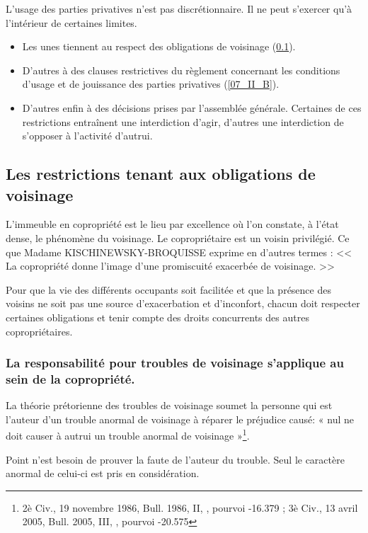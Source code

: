 	L'usage des parties privatives n'est pas discrétionnaire. Il ne peut s'exercer qu'à l'intérieur de certaines limites.
	\begin{itemize}
		\item Les unes tiennent au respect des obligations de voisinage (\ref{07_II_A}).
		\item D'autres à des clauses restrictives du règlement concernant les conditions d'usage et de jouissance des parties privatives (\ref{07_II_B}).
		\item D'autres enfin à des décisions prises par l'assemblée générale. Certaines de ces restrictions entraînent une interdiction d'agir, d'autres une interdiction de s'opposer à l'activité d'autrui.
	\end{itemize}
	
	\subsection{Les restrictions tenant aux obligations de voisinage}\label{07_II_A}
	
		L'immeuble en copropriété est le lieu par excellence où l'on constate, à l'état dense, le phénomène du voisinage.
		Le copropriétaire est un voisin privilégié. Ce que Madame KISCHINEWSKY-BROQUISSE exprime en d'autres termes : << La copropriété donne l'image d'une promiscuité exacerbée de voisinage. >>
		
		Pour que la vie des différents occupants soit facilitée et que la présence des voisins ne soit pas une source d'exacerbation et d'inconfort, chacun doit respecter certaines obligations et tenir compte des droits concurrents des autres copropriétaires.
		
		\subsubsection{La responsabilité pour troubles de voisinage s'applique au sein de la copropriété.}
		
			La théorie prétorienne des troubles de voisinage soumet la personne qui est l'auteur d'un trouble anormal de voisinage à réparer le préjudice causé: « nul ne doit causer à autrui un trouble anormal de voisinage »\footnote{2è Civ., 19 novembre 1986, Bull. 1986, II, , pourvoi -16.379 ; 3è Civ., 13 avril 2005, Bull. 2005, III, , pourvoi -20.575}.
			
			Point n'est besoin de prouver la faute de l'auteur du trouble. Seul le caractère anormal de celui-ci est pris en considération.
	

